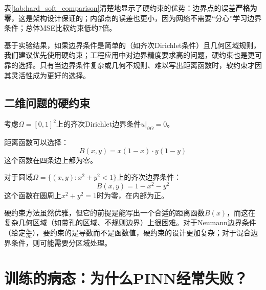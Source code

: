 表\ref{tab:hard_soft_comparison}清楚地显示了硬约束的优势：边界点的误差\textbf{严格为零}，这是架构设计保证的；内部点的误差也更小，因为网络不需要“分心”学习边界条件；总体MSE比软约束低约7倍。

\begin{tcolorbox}[colback=blue!5, colframe=blue!50, title=何时使用硬约束？]
基于实验结果，如果边界条件是简单的（如齐次Dirichlet条件）且几何区域规则，我们建议优先使用硬约束；工程应用中对边界精度要求高的问题，硬约束也是更可靠的选择。只有当边界条件复杂或几何不规则、难以写出距离函数时，软约束才因其灵活性成为更好的选择。
\end{tcolorbox}

\subsection{二维问题的硬约束}

\begin{example}[二维矩形区域]
考虑$\Omega = [0, 1]^2$上的齐次Dirichlet边界条件$u|_{\partial\Omega} = 0$。

距离函数可以选择：
\begin{equation}
    B(x, y) = x(1-x) \cdot y(1-y)
\end{equation}
这个函数在四条边上都为零。
\end{example}

\begin{example}[二维圆域]
\label{ex:circle}
对于圆域$\Omega = \{(x, y) : x^2 + y^2 < 1\}$上的齐次边界条件：
\begin{equation}
    B(x, y) = 1 - x^2 - y^2
\end{equation}
这个函数在圆周上$x^2 + y^2 = 1$时为零，在内部为正。
\end{example}

\begin{tcolorbox}[colback=red!5, colframe=red!50, title=硬约束的局限]
硬约束方法虽然优雅，但它的前提是能写出一个合适的距离函数$B(x)$，而这在复杂几何区域（如带孔的区域、不规则边界）上很困难。对于Neumann边界条件（给定$\frac{\partial u}{\partial n}$），要约束的是导数而不是函数值，硬约束的设计更加复杂；对于混合边界条件，则可能需要分区域处理。
\end{tcolorbox}

\section{训练的病态：为什么PINN经常失败？}
\label{sec:gradient_pathology}

